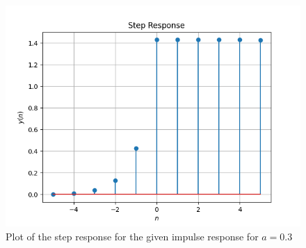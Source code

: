 \documentclass[journal,12pt,twocolumn]{IEEEtran}
\begin{document}
	\begin{figure}[!ht]
		\centering
		\includegraphics[width=\columnwidth]{./figs/fig-1.png}
		\caption{Plot of the step response for the given impulse response for $a = 0.3$}
		\label{fig-1}	
	\end{figure}
\end{document}
